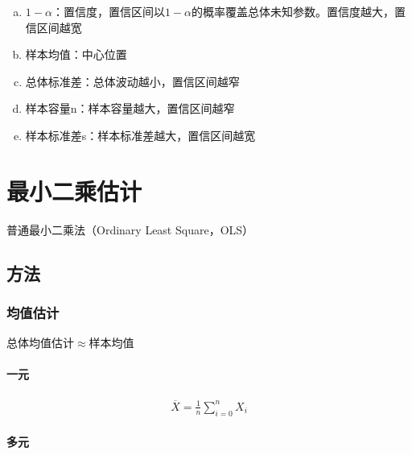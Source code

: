\documentclass[12pt]{book}
\begin{document}
\begin{enumerate}[1.]
\begin{enumerate}[(1)]
\begin{enumerate}[a.]
                        \item $1-\alpha$：置信度，置信区间以$1-\alpha$的概率覆盖总体未知参数。置信度越大，置信区间越宽
                        \item 样本均值：中心位置
                        \item 总体标准差：总体波动越小，置信区间越窄
                        \item 样本容量n：样本容量越大，置信区间越窄
                        \item 样本标准差s：样本标准差越大，置信区间越宽
                    \end{enumerate}
          \end{enumerate}
\end{enumerate}


\section{最小二乘估计}





普通最小二乘法（Ordinary Least Square，OLS）

\subsection{方法}

\subsubsection{均值估计}
总体均值估计$\approx$样本均值

\paragraph{一元}

\begin{gather*}
    \overline{X}=\frac{1}{n}\sum_{i=0}^{n}X_i
\end{gather*}



\paragraph{多元}
\end{document}

